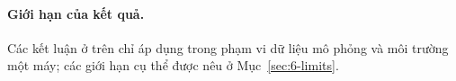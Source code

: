 \paragraph{Giới hạn của kết quả.} Các kết luận ở trên chỉ áp dụng trong phạm vi dữ liệu mô phỏng và môi trường một máy; các giới hạn cụ thể được nêu ở Mục~\ref{sec:6-limits}.
